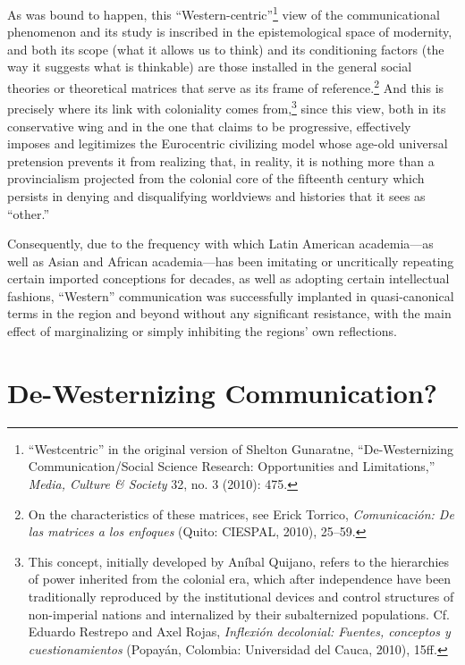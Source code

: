 \documentclass{tufte-handout}
\begin{document}
As was bound to happen, this ``Western-centric''\footnote{``Westcentric''
  in the original version of Shelton Gunaratne, ``De-Westernizing
  Communication/Social Science Research: Opportunities and
  Limitations,'' \emph{Media, Culture \& Society} 32, no. 3 (2010): 475.}
view of the communicational phenomenon and its study is inscribed in the
epistemological space of modernity, and both its scope (what it allows
us to think) and its conditioning factors (the way it suggests what is
thinkable) are those installed in the general social theories or
theoretical matrices that serve as its frame of reference.\footnote{On
  the characteristics of these matrices, see Erick Torrico,
  \emph{Comunicación: De las matrices a los enfoques} (Quito: CIESPAL,
  2010), 25--59.} And this is precisely where its link with coloniality
comes from,\footnote{This concept, initially developed by Aníbal
  Quijano, refers to the hierarchies of power inherited from the
  colonial era, which after independence have been traditionally
  reproduced by the institutional devices and control structures of
  non-imperial nations and internalized by their subalternized
  populations. Cf. Eduardo Restrepo and Axel Rojas, \emph{Inflexión
  decolonial: Fuentes, conceptos y cuestionamientos} (Popayán, Colombia:
  Universidad del Cauca, 2010), 15ff.} since this view, both in its
conservative wing and in the one that claims to be progressive,
effectively imposes and legitimizes the Eurocentric civilizing model
whose age-old universal pretension prevents it from realizing that, in
reality, it is nothing more than a provincialism projected from the
colonial core of the fifteenth century which persists in denying and
disqualifying worldviews and histories that it sees as ``other.''

Consequently, due to the frequency with which Latin American
academia---as well as Asian and African academia---has been imitating or
uncritically repeating certain imported conceptions for decades, as well
as adopting certain intellectual fashions, ``Western'' communication was
successfully implanted in quasi-canonical terms in the region and beyond
without any significant resistance, with the main effect of
marginalizing or simply inhibiting the regions' own reflections.

\hypertarget{de-westernizing-communication}{%
\section{De-Westernizing
Communication?}\label{de-westernizing-communication}}
\end{document}
